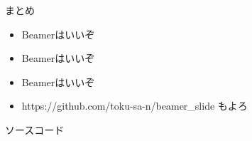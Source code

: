 \documentclass[dvipdfmx,uplatex,a4j,12pt]{beamer}
\newcommand\putsource[1]{
    \begin{frame}{ソースコード}

        
    \end{frame}
}
\newcommand\generateslides[1]{
    
    \putsource{#1.tex}
}
\begin{document}
\begin{frame}{まとめ}
    \begin{itemize}
        \item Beamerはいいぞ
        \item Beamerはいいぞ
        \item Beamerはいいぞ
            \item https://github.com/toku-sa-n/beamer\_slide もよろ
    \end{itemize}
\end{frame}

\generateslides{bib}
\end{document}
